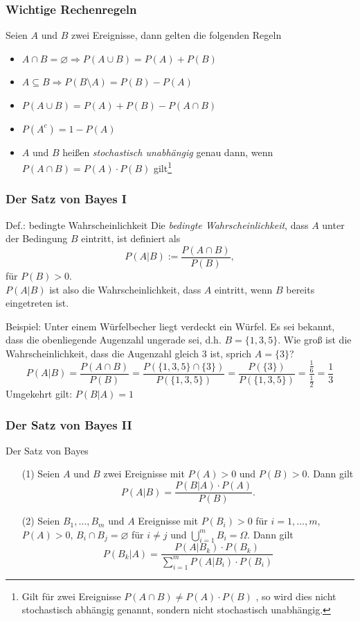 \begin{frame}
\frametitle{Wichtige Rechenregeln}
Seien $A$ und $B$ zwei Ereignisse, dann gelten die folgenden Regeln
\begin{itemize}
\item $A \cap B = \varnothing \Rightarrow P(A \cup B ) = P(A) + P(B)$
\pause
\item $A \subseteq B \Rightarrow P(B\setminus A) = P(B)-P(A)$
\pause
\item $P(A \cup B) = P(A)+P(B)-P(A \cap B)$
\pause
\item $P(A^c) = 1-P(A)$
\pause
\item $A$ und $B$ heißen \textit{stochastisch unabhängig} genau dann, wenn $P(A\cap B) = P(A) \cdot P(B)$ gilt\footnote{Gilt für zwei Ereignisse $P(A\cap B) \neq P(A) \cdot P(B)$ , so wird dies nicht \glqq stochastisch abhängig\grqq{} genannt, sondern \glqq nicht stochastisch unabhängig\grqq{}.}
\end{itemize}
\end{frame}
\begin{frame}
\frametitle{Der Satz von Bayes I}
\pause
\begin{block}{Def.: bedingte Wahrscheinlichkeit}
Die \textit{bedingte Wahrscheinlichkeit}, dass $A$ unter der Bedingung $B$ eintritt, ist definiert als
\begin{equation*}
P(A|B) := \frac{P(A \cap B)}{P(B)},
\end{equation*}
für $P(B) > 0$.\\
$P(A|B)$ ist also die Wahrscheinlichkeit, dass $A$ eintritt, wenn $B$ bereits eingetreten ist.
\end{block}
\pause
Beispiel: Unter einem Würfelbecher liegt verdeckt ein Würfel. Es sei bekannt, dass die obenliegende Augenzahl ungerade sei, d.h. $B=\{1,3,5\}$. Wie groß ist die Wahrscheinlichkeit, dass die Augenzahl gleich $3$ ist, sprich $A=\{3\}$?\\
\pause
\[
P(A|B) = \frac{P(A \cap B)}{P(B)} = \frac{P(\{1,3,5\} \cap \{3\})}{P(\{1,3,5\})} = \frac{P(\{3\})}{P(\{1,3,5\})} = \frac{\frac{1}{6}}{\frac{1}{2}} = \frac{1}{3}
\]
Umgekehrt gilt: $P(B|A) = 1$
\end{frame}
\begin{frame}
\frametitle{Der Satz von Bayes II}
\begin{block}{Der Satz von Bayes}
\begin{itemize}[<+->]
\item[(1)] Seien $A$ und $B$ zwei Ereignisse mit $P(A)>0$ und $P(B)>0$. Dann gilt
\[
P(A|B) = \frac{P(B|A)\cdot P(A)}{P(B)}.
\]
\item[(2)] Seien $B_1,\ldots,B_m$ und $A$ Ereignisse mit $P(B_i)>0$ für $i=1,\ldots,m$, $P(A)>0$, $B_i \cap B_j = \varnothing$ für $i\neq j$ und $\bigcup\limits_{i=1}^m B_i = \Omega$. Dann gilt
\[
P(B_k|A) = \frac{P(A|B_k)\cdot P(B_k)}{\sum\limits_{i=1}^m P(A|B_i)\cdot P(B_i)}
\]
\end{itemize}
\end{block}
\end{frame}
